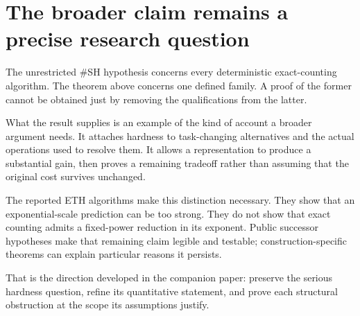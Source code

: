 \documentclass[11pt,letterpaper]{article}
\begin{document}
\section{The broader claim remains a precise research
question}\label{the-broader-claim-remains-a-precise-research-question}

The unrestricted \#SH hypothesis concerns every deterministic
exact-counting algorithm. The theorem above concerns one defined family.
A proof of the former cannot be obtained just by removing the
qualifications from the latter.

What the result supplies is an example of the kind of account a broader
argument needs. It attaches hardness to task-changing alternatives and
the actual operations used to resolve them. It allows a representation
to produce a substantial gain, then proves a remaining tradeoff rather
than assuming that the original cost survives unchanged.

The reported ETH algorithms make this distinction necessary. They show
that an exponential-scale prediction can be too strong. They do not show
that exact counting admits a fixed-power reduction in its exponent.
Public successor hypotheses make that remaining claim legible and
testable; construction-specific theorems can explain particular reasons
it persists.

That is the direction developed in the companion paper: preserve the
serious hardness question, refine its quantitative statement, and prove
each structural obstruction at the scope its assumptions justify.


\end{document}
